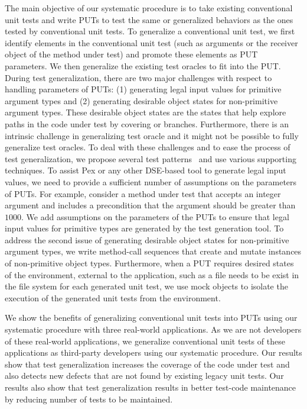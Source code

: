 The main objective of our systematic procedure is to take existing conventional unit tests and write PUTs to test the same or generalized behaviors as the ones tested by  conventional unit tests. To generalize a conventional unit test, we first identify elements in the conventional unit test (such as arguments or the receiver object of the method under test) and promote these elements as PUT parameters. We then generalize the existing test oracles to fit into the PUT. During test generalization, there are two major challenges with respect to handling parameters of PUTs: (1) generating legal input values for primitive argument types and (2) generating desirable object states for non-primitive argument types. These desirable object states are the states that help explore paths in the code under test by covering  or  branches. Furthermore, there is an intrinsic challenge in generalizing test oracle and it might not be possible to fully generalize test oracles. To deal with these challenges and to ease the process of test generalization, we propose several test patterns~\cite{halleux08:putpatterns} and use various supporting techniques. 
To assist Pex or any other DSE-based tool to generate legal input values, we need to provide a sufficient number of assumptions on the parameters of PUTs. For example, consider a method under test that accepts an integer argument and includes a precondition that the argument should be greater than $1000$. We add assumptions on the parameters of the PUTs to ensure that legal input values for primitive types are generated by the test generation tool. To address the second issue of generating desirable object states for non-primitive argument types, we write method-call sequences that create and mutate instances of non-primitive object types. Furthermore, when a PUT requires desired states of the environment, external to the application, such as a file needs to be exist in the file system for each generated unit test, we use mock objects to isolate the execution of the generated unit tests from the environment. 

We show the benefits of generalizing conventional unit tests into PUTs using our systematic procedure with three real-world applications. As we are not developers of these real-world applications, we generalize conventional unit tests of these applications as third-party developers using our systematic procedure. Our results show that test generalization increases the coverage of the code under test and also detects new defects that are not found by existing legacy unit tests. Our results also show that test generalization results in better test-code maintenance by reducing number of tests to be maintained. %

